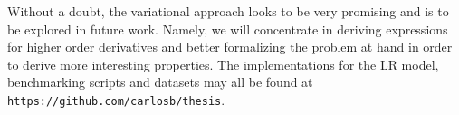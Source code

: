 \documentclass{INGUADY}
\begin{document}
\begin{body}
Without a doubt, the variational approach looks to be very promising and is to be explored in future work. Namely, we will concentrate in deriving expressions for higher order derivatives and better formalizing the problem at hand in order to derive more interesting properties.
The implementations for the LR model, benchmarking scripts and datasets may all be found at \texttt{https://github.com/carlosb/thesis}.

\end{body} %

\pagebreak

\end{document}
